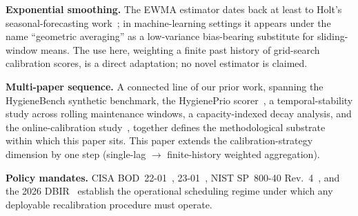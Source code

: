 \textbf{Exponential smoothing.}
The EWMA estimator dates back at least to Holt's seasonal-forecasting
work~\cite{holt2004ewma}; in machine-learning settings it appears
under the name ``geometric averaging'' as a low-variance bias-bearing
substitute for sliding-window means. The use here, weighting a
finite past history of grid-search calibration scores, is a direct
adaptation; no novel estimator is claimed.

\textbf{Multi-paper sequence.}
A connected line of our prior work, spanning the HygieneBench synthetic
benchmark, the HygienePrio scorer~\cite{paper4hygieneprio}, a temporal-stability
study across rolling maintenance windows, a capacity-indexed decay analysis,
and the online-calibration study~\cite{paper7online}, together defines the
methodological substrate within which this paper sits. This paper
extends the calibration-strategy dimension by one step (single-lag $\to$
finite-history weighted aggregation).

\textbf{Policy mandates.} CISA BOD~22-01~\cite{cisa2021bod2201},
23-01~\cite{cisa2022bod2301}, NIST SP~800-40 Rev.~4~\cite{nist2022sp80040r4},
and the 2026 DBIR~\cite{verizon2026dbir} establish the operational
scheduling regime under which any deployable recalibration procedure
must operate.
